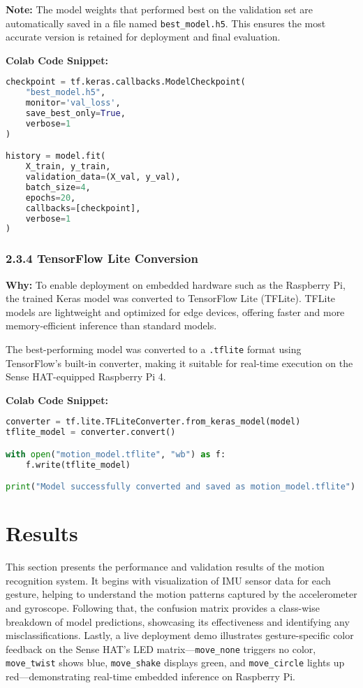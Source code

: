 \documentclass[a4paper,12pt]{article}
\begin{document}
\textbf{Note:} The model weights that performed best on the validation set are automatically saved in a file named \texttt{best\_model.h5}. This ensures the most accurate version is retained for deployment and final evaluation.


\textbf{Colab Code Snippet:}
\begin{lstlisting}[language=Python]
checkpoint = tf.keras.callbacks.ModelCheckpoint(
    "best_model.h5",
    monitor='val_loss',
    save_best_only=True,
    verbose=1
)

history = model.fit(
    X_train, y_train,
    validation_data=(X_val, y_val),
    batch_size=4,
    epochs=20,
    callbacks=[checkpoint],
    verbose=1
)
\end{lstlisting}

\subsubsection*{2.3.4 TensorFlow Lite Conversion}
\textbf{Why:} To enable deployment on embedded hardware such as the Raspberry Pi, the trained Keras model was converted to TensorFlow Lite (TFLite). TFLite models are lightweight and optimized for edge devices, offering faster and more memory-efficient inference than standard models.

The best-performing model was converted to a \texttt{.tflite} format using TensorFlow’s built-in converter, making it suitable for real-time execution on the Sense HAT-equipped Raspberry Pi 4.

\textbf{Colab Code Snippet:}
\begin{lstlisting}[language=Python]
converter = tf.lite.TFLiteConverter.from_keras_model(model)
tflite_model = converter.convert()

with open("motion_model.tflite", "wb") as f:
    f.write(tflite_model)

print("Model successfully converted and saved as motion_model.tflite")
\end{lstlisting}
\setcounter{section}{2} 

\section{Results}

This section presents the performance and validation results of the motion recognition system. It begins with visualization of IMU sensor data for each gesture, helping to understand the motion patterns captured by the accelerometer and gyroscope. Following that, the confusion matrix provides a class-wise breakdown of model predictions, showcasing its effectiveness and identifying any misclassifications. Lastly, a live deployment demo illustrates gesture-specific color feedback on the Sense HAT's LED matrix—\texttt{move\_none} triggers no color, \texttt{move\_twist} shows blue, \texttt{move\_shake} displays green, and \texttt{move\_circle} lights up red—demonstrating real-time embedded inference on Raspberry Pi.
\end{document}
